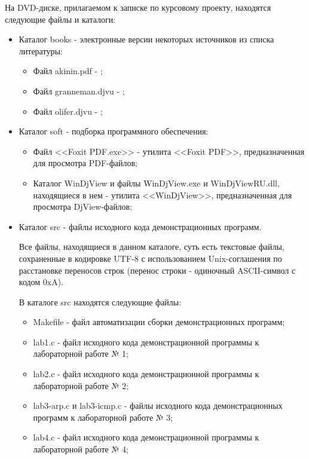 
На DVD-диске, прилагаемом к записке по курсовому проекту, находятся следующие файлы и каталоги:

\begin{itemize}

	\item Каталог books - электронные версии некоторых источников из списка литературы:

		\begin{itemize}

			\item Файл akinin.pdf - \cite{oskurs};
			\item Файл granneman.djvu - \cite{granneman};
			\item Файл olifer.djvu - \cite{olifer};

		\end{itemize}

	\item Каталог soft - подборка программного обеспечения:

		\begin{itemize}

			\item Файл <<Foxit PDF.exe>> - утилита <<Foxit PDF>>, предназначенная для просмотра PDF-файлов;
			\item Каталог WinDjView и файлы WinDjView.exe и WinDjViewRU.dll, находящиеся в нем - утилита <<WinDjView>>, предназначенная для просмотра DjView-файлов;

		\end{itemize}

	\item Каталог src - файлы исходного кода демонстрационных программ.

		Все файлы, находящиеся в данном каталоге, суть есть текстовые файлы, сохраненные в кодировке UTF-8 с использованием Unix-соглашения по расстановке переносов строк (перенос строки - одиночный
		ASCII-символ с кодом 0xA).

		В каталоге src находятся следующие файлы:

		\begin{itemize}
		
			\item Makefile - файл автоматизации сборки демонстрационных программ;
			\item lab1.c - файл исходного кода демонстрационной программы к лабораторной работе № 1;
			\item lab2.c - файл исходного кода демонстрационной программы к лабораторной работе № 2;
			\item lab3-arp.c и lab3-icmp.c - файлы исходного кода демонстрационных программ к лабораторной работе № 3;
			\item lab4.c - файл исходного кода демонстрационной программы к лабораторной работе № 4;


\end{itemize}
\end{itemize}
